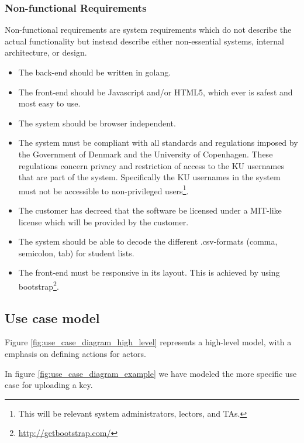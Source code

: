 \documentclass[11pt,a4paper]{report}
\begin{document}
\subsubsection{Non-functional Requirements}
Non-functional requirements are system requirements which do not describe the actual functionality but instead describe either non-essential systems, internal architecture, or design.
\begin{itemize}
\item The back-end should be written in golang.
\item The front-end should be Javascript and/or HTML5, which ever is safest and most easy to use.
\item The system should be browser independent.
\item The system must be compliant with all standards and regulations imposed by the Government of Denmark and the University of Copenhagen. These regulations concern privacy and restriction of access to the KU usernames that are part of the system. Specifically the KU usernames in the system must not be accessible to non-privileged users\footnote{This will be relevant system administrators, lectors, and TAs.}.
\item The customer has decreed that the software be licensed under a MIT-like license which will be provided by the customer.
\item The system should be able to decode the different .csv-formats (comma, semicolon, tab) for student lists.
\item The front-end must be responsive in its layout. This is achieved by using bootstrap\footnote{\href{http://getbootstrap.com/}{http://getbootstrap.com/}}.
\end{itemize}

\subsection{Use case model}

Figure \ref{fig:use_case_diagram_high_level} represents a high-level model, with a emphasis on defining actions for actors.

In figure \ref{fig:use_case_diagram_example} we have modeled the more specific use case for uploading a key.
\end{document}
